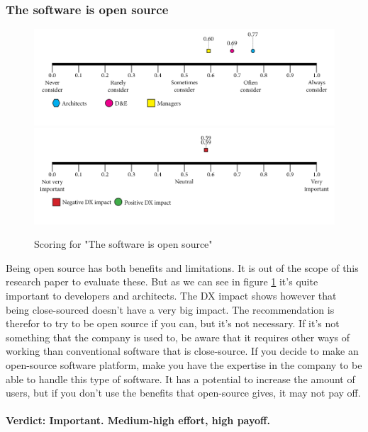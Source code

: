 \documentclass{article}
\begin{document}
\subsubsection{The software is open source}
\begin{figure}[H]
\centering
\includegraphics[width=\linewidth]{scorelines/aspect14.png}
\includegraphics[width=\linewidth]{dxscorelines/dxaspect14.png}
\caption{Scoring for "The software is open source"}
\label{fig:aspect14}
\end{figure}
Being open source has both benefits and limitations. It is out of the scope of this research paper to evaluate these. But as we can see in figure \ref{fig:aspect14} it's quite important to developers and architects. The DX impact shows however that being close-sourced doesn't have a very big impact. The recommendation is therefor to try to be open source if you can, but it's not necessary. If it's not something that the company is used to, be aware that it requires other ways of working than conventional software that is close-source. If you decide to make an open-source software platform, make you have the expertise in the company to be able to handle this type of software. It has a potential to increase the amount of users, but if you don't use the benefits that open-source gives, it may not pay off. \\ \\
\textbf{Verdict: Important. Medium-high effort, high payoff.}
\end{document}
